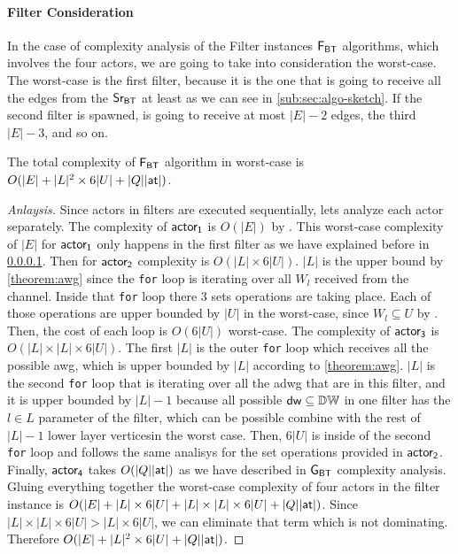\paragraph{Filter Consideration}\label{comp:an:filter:note} In the case of complexity analysis of the Filter instances $\mathsf{F_{BT}}$ algorithms, which involves the four actors, we are going to take into consideration the worst-case.
The worst-case is the first filter, because it is the one that is going to receive all the edges from the $\mathsf{Sr_{BT}}$ at least as we can see in \autoref{sub:sec:algo-sketch}. 
If the second filter is spawned, is going to receive at most $|E|-2$ edges, the third $|E|-3$, and so on. 

\begin{complexity}
The total complexity of $\mathsf{F_{BT}}$ algorithm in worst-case is $O(|E| + |L|^2 \times 6|U| + |Q||\mathsf{at}|)$.
\end{complexity}
\begin{proof}[Anlaysis]
Since actors in filters are executed sequentially, lets analyze each actor separately. 
The complexity of $\mathsf{actor_1}$ is $O(|E|)$ by . 
This worst-case complexity of $|E|$ for $\mathsf{actor_1}$ only happens in the first filter as we have explained before in \ref{comp:an:filter:note}. 
Then for $\mathsf{actor_2}$ complexity is $O(|L| \times 6|U|)$. $|L|$ is the upper bound by \autoref{theorem:awg} since the \texttt{for} loop is iterating over all $W_l$ received from the channel.
Inside that \texttt{for} loop there 3 sets operations are taking place. Each of those operations are upper bounded by $|U|$ in the worst-case, since $W_l \subseteq U$ by . 
Then, the cost of each loop is $O(6|U|)$ worst-case.  
The complexity of $\mathsf{actor_3}$ is $O(|L| \times |L| \times 6|U|)$. The first $|L|$ is the outer \texttt{for} loop which receives all the possible \acrshort{awg}, which is upper bounded by $|L|$ according to \autoref{theorem:awg}.
$|L|$ is the second \texttt{for} loop that is iterating over all the \acrshort{adwg} that are in this filter, and it is upper bounded by $|L|-1$ because all possible $\mathsf{dw} \subseteq \mathbb{DW}$ in one filter has the $l \in L$ parameter of the filter, which can be possible combine with the rest of $|L|-1$ lower layer verticesin the worst case. 
Then, $6|U|$ is inside of the second \texttt{for} loop and follows the same analisys for the set operations provided in $\mathsf{actor_2}$. Finally, $\mathsf{actor_4}$ takes $O(|Q||\mathsf{at}|)$ as we have described in $\mathsf{G_{BT}}$ complexity analysis.
Gluing everything together the worst-case complexity of four actors in the filter instance is $O(|E| + |L| \times 6|U| + |L| \times |L| \times 6|U| + |Q||\mathsf{at}|)$. 
Since $|L| \times |L| \times 6|U| > |L| \times 6|U|$, we can eliminate that term which is not dominating. Therefore $O(|E| + |L|^2 \times 6|U| + |Q||\mathsf{at}|)$.

\end{proof}
\fi   
      
